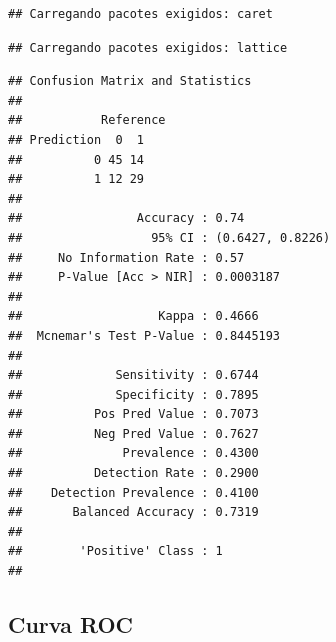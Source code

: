 \documentclass[12pt,brazil,]{book}
\newenvironment{Shaded}{\begin{snugshade}}{\end{snugshade}}
\newcommand{\DataTypeTok}[1]{\textcolor[rgb]{0.13,0.29,0.53}{#1}}
\newcommand{\FloatTok}[1]{\textcolor[rgb]{0.00,0.00,0.81}{#1}}
\newcommand{\KeywordTok}[1]{\textcolor[rgb]{0.13,0.29,0.53}{\textbf{#1}}}
\newcommand{\NormalTok}[1]{#1}
\newcommand{\OperatorTok}[1]{\textcolor[rgb]{0.81,0.36,0.00}{\textbf{#1}}}
\newcommand{\StringTok}[1]{\textcolor[rgb]{0.31,0.60,0.02}{#1}}
\begin{document}
\begin{verbatim}
## Carregando pacotes exigidos: caret
\end{verbatim}

\begin{verbatim}
## Carregando pacotes exigidos: lattice
\end{verbatim}

\begin{Shaded}
\end{Shaded}

\begin{verbatim}
## Confusion Matrix and Statistics
## 
##           Reference
## Prediction  0  1
##          0 45 14
##          1 12 29
##                                           
##                Accuracy : 0.74            
##                  95% CI : (0.6427, 0.8226)
##     No Information Rate : 0.57            
##     P-Value [Acc > NIR] : 0.0003187       
##                                           
##                   Kappa : 0.4666          
##  Mcnemar's Test P-Value : 0.8445193       
##                                           
##             Sensitivity : 0.6744          
##             Specificity : 0.7895          
##          Pos Pred Value : 0.7073          
##          Neg Pred Value : 0.7627          
##              Prevalence : 0.4300          
##          Detection Rate : 0.2900          
##    Detection Prevalence : 0.4100          
##       Balanced Accuracy : 0.7319          
##                                           
##        'Positive' Class : 1               
## 
\end{verbatim}

\hypertarget{curva-roc}{%
\subsection{Curva ROC}\label{curva-roc}}
\end{document}
